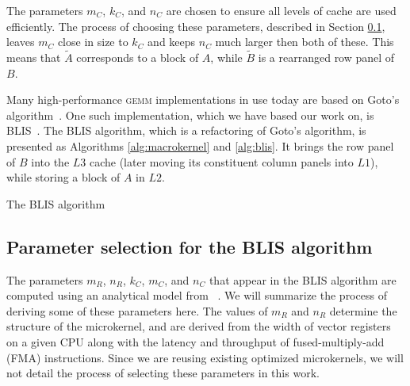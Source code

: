 \documentclass[12pt]{article}
\newcommand*{\TO}{\textbf{to}}
\newcommand*{\gemm}{{\textsc{gemm}}}
\newcommand*{\mycite}[1]{~\cite{#1}}
\begin{document}
The parameters $m_C$, $k_C$, and $n_C$ are chosen to ensure all levels of cache are used efficiently.
The process of choosing these parameters, described in Section \ref{subsec:params}, leaves $m_C$ close in size to $k_C$ and keeps $n_C$ much larger then both of these.
This means that $\widetilde{A}$ corresponds to a block of $A$, while $\widetilde{B}$ is a rearranged row panel of $B$.

Many high-performance \gemm{} implementations in use today are based on Goto's algorithm\mycite{Goto2008}.
One such implementation, which we have based our work on, is BLIS\mycite{VanZee2016}.
The BLIS algorithm, which is a refactoring of Goto's algorithm, is presented as Algorithms \ref{alg:macrokernel} and  \ref{alg:blis}.
It brings the row panel of $B$ into the $L3$ cache (later moving its constituent column panels into $L1$), while storing a block of $A$ in $L2$.
\begin{algorithm}
  \caption{The BLIS algorithm}
  \label{alg:blis}
  \begin{tikzpicture}
    
  \end{tikzpicture}
  \begin{algorithmic}
    \For{$j \gets 0, n_C, \ldots$ \TO{} $n$}
    \For{$p \gets 0, k_C, \ldots$ \TO{} $k$}
    \For{$i \gets 0, m_C, \ldots$ \TO{} $m$}
    \EndFor{}
    \EndFor{}
    \EndFor{}
    \EndProcedure{}
  \end{algorithmic}
\end{algorithm}

\subsection{Parameter selection for the BLIS algorithm}\label{subsec:params}
The parameters $m_R$, $n_R$, $k_C$, $m_C$, and $n_C$ that appear in the BLIS algorithm are computed using an analytical model from \mycite{Low2016}.
We will summarize the process of deriving some of these parameters here.
The values of $m_R$ and $n_R$ determine the structure of the microkernel, and are derived from the width of vector registers on a given CPU along with the latency and throughput of fused-multiply-add (FMA) instructions.
Since we are reusing existing optimized microkernels, we will not detail the process of selecting these parameters in this work.
\end{document}
